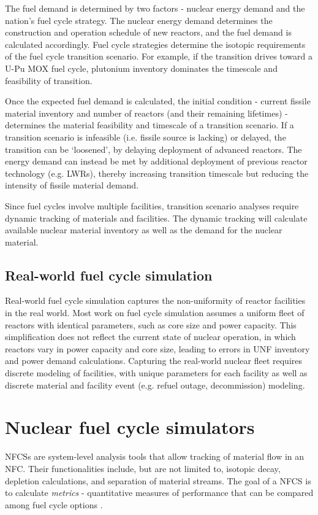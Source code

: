 The fuel demand is determined by two factors - nuclear energy demand
and the nation's fuel cycle strategy.
The nuclear energy demand determines the construction
and operation
schedule of new reactors, and the fuel demand is
calculated accordingly.
Fuel cycle strategies determine the isotopic
requirements of the fuel cycle transition scenario. For example,
if the transition drives toward a U-Pu \gls{MOX} fuel cycle,
plutonium inventory dominates the timescale and feasibility of transition.

Once the expected fuel demand is calculated,
the initial condition - current fissile material inventory
and number of reactors (and their remaining lifetimes) - determines
the material feasibility and timescale of a transition scenario.
If a transition scenario is infeasible (i.e. fissile source is lacking) or delayed,
the transition can be `loosened', by delaying deployment
of advanced reactors. The energy demand can instead be met by additional
deployment of previous reactor technology (e.g. \glspl{LWR}),
thereby increasing transition timescale but reducing the
intensity of fissile material demand.

Since fuel cycles involve multiple facilities,
transition scenario analyses require
dynamic tracking of materials and facilities.
The dynamic tracking will calculate available nuclear material
inventory as well as the demand for the nuclear
material.

\subsection{Real-world fuel cycle simulation}
Real-world fuel cycle simulation captures the non-uniformity of
reactor facilities in the real world. Most work on fuel cycle
simulation assumes a uniform fleet of reactors with identical
parameters, such as core size and power capacity. This simplification
does not reflect the current state of nuclear operation, in which
reactors vary in power capacity and core size, leading
to errors in \gls{UNF} inventory and power demand calculations.
Capturing the real-world nuclear fleet requires discrete
modeling of facilities, with unique parameters for each facility
as well as discrete material and facility event (e.g. refuel outage,
decommission) modeling.

\section{Nuclear fuel cycle simulators}
\glspl{NFCS} are system-level analysis tools
that allow tracking of material flow in an \gls{NFC}. Their
functionalities include, but are not limited to, isotopic decay,
depletion calculations, and separation of material streams.
The goal of a \gls{NFCS} is to calculate \textit{metrics} - quantitative
measures of performance that can be compared among fuel cycle
options \cite{huff_fundamental_2016}.

